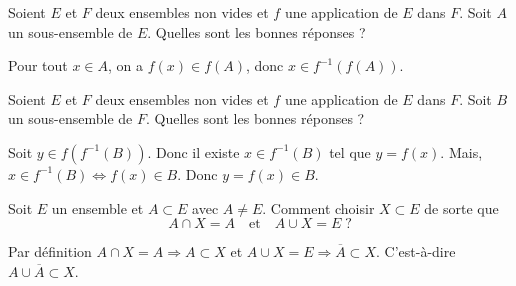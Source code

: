 \begin{question}

Soient $E$ et $F$ deux ensembles non vides et $f$ une application de $E$ dans $F$. Soit $A$ un sous-ensemble de $E$. Quelles sont les bonnes réponses ?
\begin{answers}  
\end{answers}
\begin{explanations}
Pour tout $x\in A$, on a $f(x)\in f(A)$, donc $x\in f^{-1}(f(A))$.
\end{explanations}
\end{question}


\begin{question}

Soient $E$ et $F$ deux ensembles non vides et $f$ une application de $E$ dans $F$. Soit $B$ un sous-ensemble de $F$. Quelles sont les bonnes réponses ?
\begin{answers}  
\end{answers}
\begin{explanations}
Soit $y\in f(f^{-1}(B))$. Donc il existe $x\in f^{-1}(B)$ tel que $y=f(x)$. Mais, $x\in f^{-1}(B)\Leftrightarrow f(x)\in B$. Donc $y=f(x)\in B$.
\end{explanations}
\end{question}



\begin{question}

Soit $E$ un ensemble et $A\subset E$ avec $A\neq E$. Comment choisir $X\subset E$ de sorte que
$$A\cap X=A\quad \mbox{et}\quad A\cup X=E \; ?$$
\begin{answers}  
\end{answers}
\begin{explanations}
Par définition $A\cap X=A\Rightarrow A\subset X$ et $A\cup X=E\Rightarrow \overline{A}\subset X$. C'est-à-dire $A\cup \overline{A}\subset X$.
\end{explanations}
\end{question}



